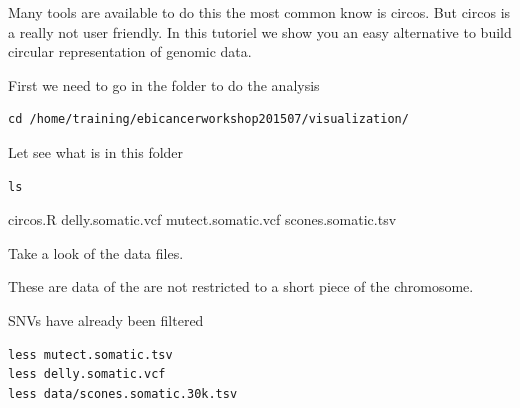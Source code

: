 \begin{description}[style=multiline,labelindent=1.5cm,align=left,leftmargin=2.5cm]
  \item[\texttt{mutect.somatic.vcf} \hfill\\]
  \item[\texttt{delly.somatic.vcf} \hfill\\]
  \item[\texttt{scones.somatic.tsv} \hfill\\] 
\end{description}





Many tools are available to do this the most common know is circos. But circos is a really not user friendly. In this tutoriel we show you an easy alternative to build circular representation of genomic data.

First we need to go in the folder to do the analysis

\begin{steps}
\begin{lstlisting}
cd /home/training/ebicancerworkshop201507/visualization/
\end{lstlisting}
\end{steps}

Let see what is in this folder

\begin{steps}
\begin{lstlisting}
ls
\end{lstlisting}
\end{steps}

circos.R delly.somatic.vcf mutect.somatic.vcf scones.somatic.tsv

Take a look of the data files.

These are data of the are not restricted to a short piece of the chromosome.

SNVs have already been filtered 

\begin{steps}
\begin{lstlisting}
less mutect.somatic.tsv
less delly.somatic.vcf
less data/scones.somatic.30k.tsv
\end{lstlisting}
\end{steps}


